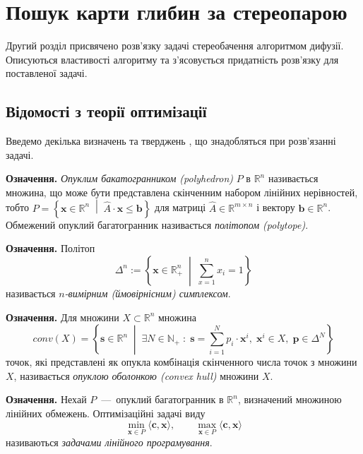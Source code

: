 \chapter{Пошук карти глибин за стереопарою}

Другий розділ присвячено розв'язку задачі стереобачення алгоритмом дифузії.
Описуються властивості алгоритму та з'ясовується придатність
розв'язку для поставленої задачі.

\section{Відомості з теорії оптимізації}
Введемо декілька визначень та тверджень \cite{overview:savchynskyy:diffusion},
що знадобляться при розв'язанні задачі.

\textbf{Означення.}
\textit{Опуклим бакатогранником (polyhedron)} $P$ в $\mathbb{R}^n$ називається множина,
що може бути представлена скінченним набором лінійних нерівностей,
тобто
$P = \left\{
    \pmb{x} \in \mathbb{R}^n \; \middle| \;
    \hat{A} \cdot \pmb{x} \le \pmb{b}
\right\}$
для матриці $\hat{A} \in \mathbb{R}^{m \times n}$ і вектору
$\pmb{b} \in \mathbb{R}^n$.
Обмежений опуклий багатогранник називається \textit{політопом (polytope)}.

\textbf{Означення.}
Політоп
\begin{equation} \label{eq:simplex}
    \Delta^n := \left\{
    \pmb{x} \in \mathbb{R}^n_+ \; \middle| \; \sum \limits_{x = 1}^n x_i = 1
    \right\}
\end{equation}
називається \textit{$n$-вимірним (ймовірнісним) симплексом}.

\textbf{Означення.}
Для множини $X \subset \mathbb{R}^n$ множина
\begin{equation*}
    conv \left(X \right) = \left\{
        \pmb{s} \in \mathbb{R}^n \; \middle| \;
        \exists N \in \mathbb{N}_+ \; : \;
        \pmb{s} = \sum \limits_{i = 1}^N p_i \cdot \pmb{x}^i, \;
        \pmb{x}^i \in X, \;
        \pmb{p} \in \Delta^N
    \right\}
\end{equation*}
точок,
які представлені як опукла комбінація скінченного числа точок з множини $X$,
називається \textit{опуклою оболонкою (convex hull)} множини $X$.

\textbf{Означення.}
Нехай $P$~---~опуклий багатогранник в $\mathbb{R}^n$,
визначений множиною лінійних обмежень.
Оптимізаційні задачі виду
\begin{equation*}
    \min \limits_{\pmb{x} \in P} \langle \pmb{c}, \pmb{x} \rangle, \qquad
    \max \limits_{\pmb{x} \in P} \langle \pmb{c}, \pmb{x} \rangle
\end{equation*}
називаються \textit{задачами лінійного програмування}.

